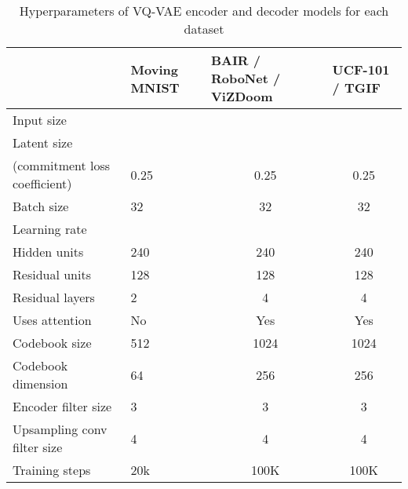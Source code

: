 \documentclass{article}
\begin{document}
\begin{table}[h]
\caption{Hyperparameters of VQ-VAE encoder and decoder models for each dataset}
\begin{tabular}{@{}llcc@{}}
\toprule
                                                           & Moving MNIST           & \multicolumn{1}{l}{BAIR / RoboNet / ViZDoom} & \multicolumn{1}{l}{UCF-101 / TGIF} \\ \midrule
\multicolumn{1}{l|}{Input size}                            &  &                        &              \\
\multicolumn{1}{l|}{Latent size}                           &     &                          &                 \\
\multicolumn{1}{l|}{ (commitment loss coefficient)} & 0.25                   & 0.25                                         & 0.25                               \\
\multicolumn{1}{l|}{Batch size}                            & 32                     & 32                                           & 32                                 \\
\multicolumn{1}{l|}{Learning rate}                         &       &                             &                   \\
\multicolumn{1}{l|}{Hidden units}                          & 240                    & 240                                          & 240                                \\
\multicolumn{1}{l|}{Residual units}                        & 128                    & 128                                          & 128                                \\
\multicolumn{1}{l|}{Residual layers}                       & 2                      & 4                                            & 4                                  \\
\multicolumn{1}{l|}{Uses attention}                        & No                     & Yes                                          & Yes                                \\
\multicolumn{1}{l|}{Codebook size}                         & 512                    & 1024                                         & 1024                               \\
\multicolumn{1}{l|}{Codebook dimension}                    & 64                     & 256                                          & 256                                \\
\multicolumn{1}{l|}{Encoder filter size}                   & 3                      & 3                                            & 3                                  \\
\multicolumn{1}{l|}{Upsampling conv filter size}           & 4                      & 4                                            & 4                                  \\
\multicolumn{1}{l|}{Training steps}                                             & 20k                    & 100K                                         & 100K                               \\ \bottomrule
\end{tabular}
\end{table}
\end{document}
